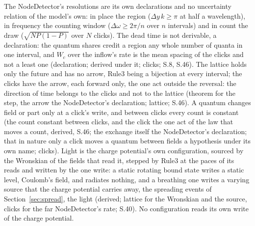 \documentclass[pdflatex,sn-mathphys-num]{sn-jnl}
\newcommand{\Wc}{W_c}
\theoremstyle{thmstyleone}
\theoremstyle{thmstyletwo}
\begin{document}
The NodeDetector's resolutions are its own declarations and no uncertainty relation of the model's own: in place the region ($\Delta y\,k \ge \pi$ at half a wavelength), in frequency the counting window ($\Delta\omega \ge 2\pi / n$ over $n$ intervals) and in count the draw ($\sqrt{NP(1 - P)}$ over $N$ clicks). The dead time is not derivable, a declaration: the quantum shares credit a region any whole number of quanta in one interval, and $\Wc$ over the inflow's rate is the mean spacing of the clicks and not a least one (declaration; derived under it; clicks; S.8, S.46). The lattice holds only the future and has no arrow, Rule3 being a bijection at every interval; the clicks have the arrow, each forward only, the one act outside the reversal: the direction of time belongs to the clicks and not to the lattice (theorem for the step, the arrow the NodeDetector's declaration; lattice; S.46). A quantum changes field or part only at a click's write, and between clicks every count is constant (the count constant between clicks, and the click the one act of the law that moves a count, derived, S.46; the exchange itself the NodeDetector's declaration; that in nature only a click moves a quantum between fields a hypothesis under its own name; clicks). Light is the charge potential's own configuration, sourced by the Wronskian of the fields that read it, stepped by Rule3 at the paces of its reads and written by the one write: a static rotating bound state writes a static level, Coulomb's field, and radiates nothing, and a breathing one writes a varying source that the charge potential carries away, the spreading events of Section~\ref{sec:spread}, the light (derived; lattice for the Wronskian and the source, clicks for the far NodeDetector's rate; S.40). No configuration reads its own write of the charge potential.
\end{document}
